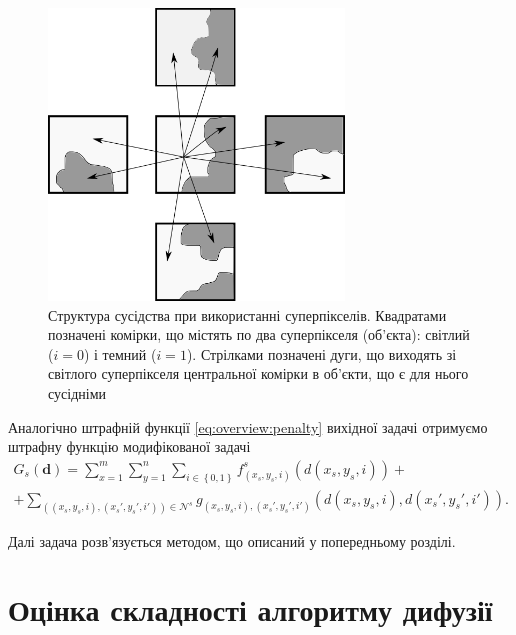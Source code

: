 \begin{figure}[h]
  \centering
  \includegraphics[width=0.7\textwidth]{images/neighbours_superpixel}
  \caption{Структура сусідства при використанні суперпікселів.
           Квадратами позначені комірки,
           що містять по два суперпікселя (об'єкта):
           світлий ($i = 0$) і темний ($i = 1$).
           Стрілками позначені дуги,
           що виходять зі світлого суперпікселя центральної комірки в об'єкти,
           що є для нього сусідніми}
  \label{fig:superpixel:neighbors}
\end{figure}

Аналогічно штрафній функції \eqref{eq:overview:penalty}
вихідної задачі отримуємо штрафну функцію модифікованої задачі
\begin{equation*}
\begin{gathered}
    G_s \left( \pmb{d} \right)
    = \sum \limits_{x = 1}^{m}
        \sum \limits_{y = 1}^{n}
            \sum \limits_{i \in \left\{ 0, 1 \right\}}
                f_{\left( x_s, y_s, i \right)}^s
                    \left( d \left(x_s, y_s, i \right) \right) + \\
    + \sum \limits_{\left( \left(x_s, y_s, i \right), \left(x_s', y_s', i' \right) \right) \in \mathcal{N}^s}
            g_{\left(x_s, y_s, i \right), \left(x_s', y_s', i' \right)} \left(
                d \left( x_s, y_s, i \right), d \left( x_s', y_s', i' \right)
            \right).
\end{gathered}
\end{equation*}

Далі задача розв'язується методом, що описаний у попередньому розділі.

\section{Оцінка складності алгоритму дифузії}

